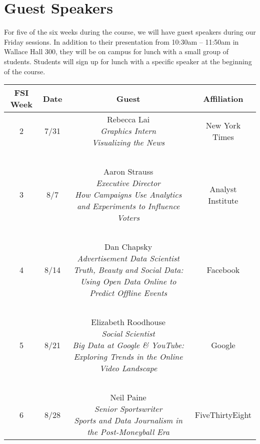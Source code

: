 \documentclass[11pt,letterpaper]{article}
\begin{document}
\section*{Guest Speakers}

For five of the six weeks during the course, we will have guest
speakers during our Friday sessions. In addition to their presentation
from 10:30am -- 11:50am in Wallace Hall 300, they will be on campus
for lunch with a small group of students. Students will sign up for
lunch with a specific speaker at the beginning of the course.

\small
\begin{center}
  \renewcommand{\arraystretch}{1.2}
  \begin{tabular}{c c c c}
    \hline
    \bf FSI  Week & \bf Date & \bf Guest                                     & \bf Affiliation    \\
    \hline
    2             & 7/31     & \parbox{3in}{\vspace{.1cm} Rebecca Lai  \\ \it Graphics Intern              \\      
      \sc Visualizing the News}                                         & New York Times     \\
    ~ \\
    3             & 8/7      & \parbox{3in}{Aaron Strauss \\ \it Executive Director                    \\
      \sc How Campaigns Use Analytics and Experiments to Influence Voters}                        & Analyst Institute           \\ 
    ~ \\
    4             & 8/14      & \parbox{3in}{Dan Chapsky \\ \it Advertisement Data Scientist \\
      \sc Truth, Beauty and Social Data: Using Open Data Online to Predict Offline Events} & Facebook \\
    ~ \\
    5             & 8/21     & \parbox{3in}{Elizabeth Roodhouse \\ \it Social Scientist \\
      \sc Big Data at Google \& YouTube:  Exploring Trends in the Online Video Landscape}                                       & Google \\
    ~ \\
    6             & 8/28     & \parbox{3in}{Neil Paine \\ \it Senior Sportswriter \\
    	\sc Sports and Data Journalism in the Post-Moneyball Era \vspace{.1cm}}                                       & FiveThirtyEight \\
    \hline
  \end{tabular}
\end{center}


\clearpage
\end{document}
